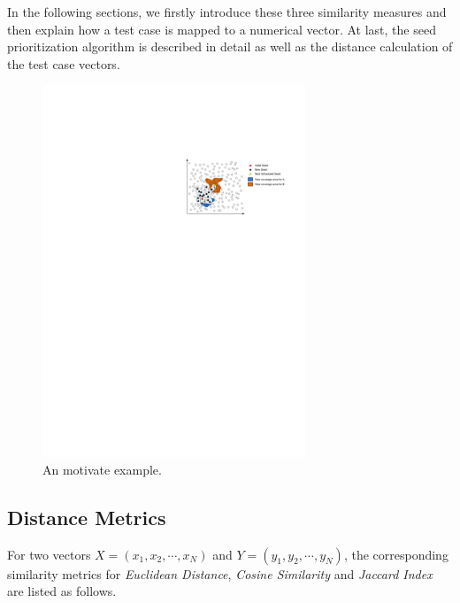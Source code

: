 In the following sections, we firstly introduce these three similarity measures and then explain how a test case is mapped to a numerical vector. At last, the seed prioritization algorithm is described in detail as well as the distance calculation of the test case vectors.

\begin{figure}
\centering
\includegraphics[width=0.7\textwidth]{figures/motivate-example.pdf} 
\caption{An motivate example.}\label{motivate-example}
\end{figure}

\subsection{Distance Metrics}
For two vectors $\mathit{X} = (x_1, x_2, \cdots, x_N)$ and $\mathit{Y} = (y_1, y_2, \cdots, y_N)$, the corresponding similarity metrics for \textit{Euclidean Distance}, \textit{Cosine Similarity} and \textit{Jaccard Index} are listed as follows.

